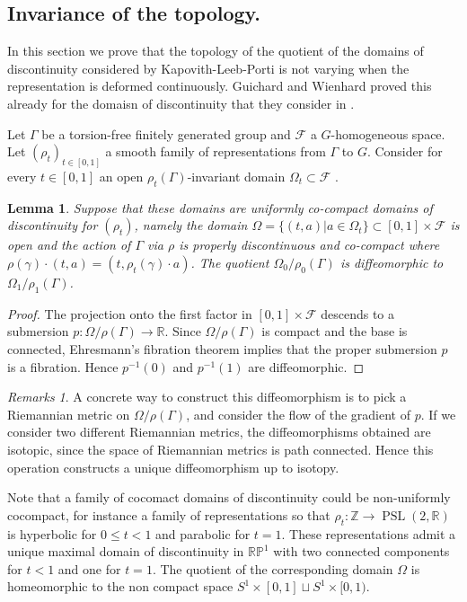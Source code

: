 \documentclass[reqno,10pt]{amsart}
\theoremstyle{plain}
\newtheorem{lem}[thm]{Lemma}
\theoremstyle{definition}
\theoremstyle{remark}
\newtheorem{rems}[thm]{Remarks}
\newcommand{\R}{\mathbb{R}}
\DeclareMathOperator{\PSL}{PSL}
\newcommand{\ie}{namely }
\begin{document}
\subsection{Invariance of the topology.}
\label{subsec:Ehresman Principle}

In this section we prove that the topology of the quotient of the domains of discontinuity considered by Kapovith-Leeb-Porti is not varying when the representation is deformed continuously. Guichard and Wienhard proved this already for the domaisn of discontinuity that they consider in \cite{GWDod}.

\medskip

Let $\Gamma$ be a torsion-free finitely generated group and $\mathcal{F}$ a $G$-homogeneous space. Let $(\rho_t)_{t\in [0,1]}$ a smooth family of representations from $\Gamma$ to $G$. Consider for every $t\in [0,1]$ an open $\rho_t(\Gamma)$-invariant domain $\Omega_t\subset \mathcal{F}$ .

\begin{lem}
\label{lem:EhresmannPrinciple}
Suppose that these domains are \emph{uniformly} co-compact domains of discontinuity for $(\rho_t)$, \ie the domain $\Omega=\lbrace(t,a)|a\in \Omega_t\rbrace\subset [0,1]\times \mathcal{F}$ is open and the action of $\Gamma$ via $\rho$ is properly discontinuous and co-compact where $\rho(\gamma)\cdot (t,a)=(t,\rho_t(\gamma)\cdot a)$. The quotient $\Omega_0/\rho_0(\Gamma)$ is diffeomorphic to $\Omega_1/\rho_1(\Gamma)$.
\end{lem}

\begin{proof}
The projection onto the first factor in $[0,1]\times \mathcal{F}$ descends to a submersion $p:\Omega/\rho(\Gamma)\to \R$. Since $\Omega/\rho(\Gamma)$ is compact and the base is connected, Ehresmann's fibration theorem implies that the proper submersion $p$ is a fibration. Hence $p^{-1}(0)$ and $p^{-1}(1)$ are diffeomorphic. 
\end{proof}

\begin{rems}
A concrete way to construct this diffeomorphism is to pick a Riemannian metric on $\Omega/\rho(\Gamma)$, and consider the flow of the gradient of $p$.
If we consider two different Riemannian metrics, the diffeomorphisms obtained are isotopic, since the space of Riemannian metrics is path connected. Hence this operation constructs a unique diffeomorphism up to isotopy.

\medskip

Note that a family of cocomact domains of discontinuity could be non-uniformly cocompact, for instance a family of representations so that $\rho_t:\mathbb{Z}\to \PSL(2,\R)$ is hyperbolic for $0\leq t<1$ and parabolic for $t=1$. These representations admit a unique maximal domain of discontinuity in $\mathbb{RP}^1$ with two connected components for $t<1$ and one for $t=1$. The quotient of the corresponding domain $\Omega$ is homeomorphic to the non compact space $S^1\times [0,1]\sqcup S^1 \times [0,1)$.
\end{rems}
\end{document}
